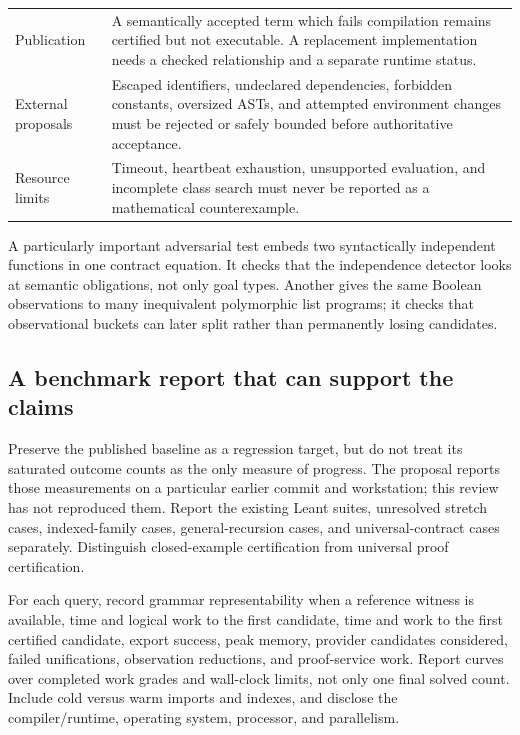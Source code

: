 \begin{longtable}{@{}L{38mm}L{114mm}@{}}
Publication & A semantically accepted term which fails compilation remains certified but not executable. A replacement implementation needs a checked relationship and a separate runtime status.\\
External proposals & Escaped identifiers, undeclared dependencies, forbidden constants, oversized ASTs, and attempted environment changes must be rejected or safely bounded before authoritative acceptance.\\
Resource limits & Timeout, heartbeat exhaustion, unsupported evaluation, and incomplete class search must never be reported as a mathematical counterexample.\\
\bottomrule
\end{longtable}

A particularly important adversarial test embeds two syntactically independent functions in one contract equation. It checks that the independence detector looks at semantic obligations, not only goal types. Another gives the same Boolean observations to many inequivalent polymorphic list programs; it checks that observational buckets can later split rather than permanently losing candidates.

\subsection{A benchmark report that can support the claims}

Preserve the published baseline as a regression target, but do not treat its saturated outcome counts as the only measure of progress. The proposal reports those measurements on a particular earlier commit and workstation; this review has not reproduced them.\cite{evidence} Report the existing Leant suites, unresolved stretch cases, indexed-family cases, general-recursion cases, and universal-contract cases separately. Distinguish closed-example certification from universal proof certification.

For each query, record grammar representability when a reference witness is available, time and logical work to the first candidate, time and work to the first certified candidate, export success, peak memory, provider candidates considered, failed unifications, observation reductions, and proof-service work. Report curves over completed work grades and wall-clock limits, not only one final solved count. Include cold versus warm imports and indexes, and disclose the compiler/runtime, operating system, processor, and parallelism.


